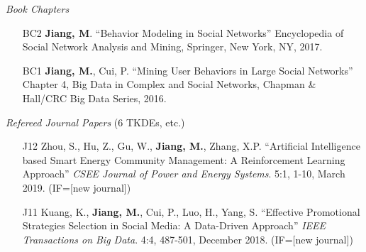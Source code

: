 \documentclass[10pt]{article}
\newenvironment{myindentpar}[1]%
{\begin{list}{}%
         {\setlength{\leftmargin}{#1}}%
         \item[]%
}
{\end{list}}
\newcounter{list}
\begin{document}
\begin{myindentpar}{0.00cm}

\hspace{-0.25cm}\emph{Book Chapters}

\begin{enumerate}[leftmargin=.5cm]

\item[BC2] \textbf{Jiang, M}. ``Behavior Modeling in Social Networks'' Encyclopedia of Social Network Analysis and Mining, Springer, New York, NY, 2017.
		
\item[BC1] \textbf{Jiang, M.}, Cui, P. ``Mining User Behaviors in Large Social Networks'' Chapter 4, Big Data in Complex and Social Networks, Chapman \& Hall/CRC Big Data Series, 2016.

\vspace{-0.1cm}

\end{enumerate}

\hspace{-0.25cm}\emph{Refereed Journal Papers} (6 TKDEs, etc.)

\begin{enumerate}[leftmargin=.5cm]

\item[J12] Zhou, S., Hu, Z., Gu, W., \textbf{Jiang, M.}, Zhang, X.P. ``Artificial Intelligence based Smart Energy Community Management: A Reinforcement Learning Approach'' \textit{CSEE Journal of Power and Energy Systems}. 5:1, 1-10, March 2019. (IF=[new journal])

\vspace{-0.1cm}

\item[J11] Kuang, K., \textbf{Jiang, M.}, Cui, P., Luo, H., Yang, S. ``Effective Promotional Strategies Selection in Social Media: A Data-Driven Approach'' \textit{IEEE Transactions on Big Data}. 4:4, 487-501, December 2018. (IF=[new journal])

\vspace{-0.1cm}


\end{enumerate}
\end{myindentpar}
\end{document}
